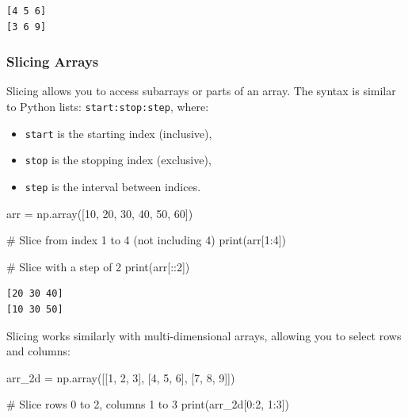 \documentclass[
  letterpaper,
  DIV=11,
  numbers=noendperiod]{scrreprt}
\newenvironment{Shaded}{\begin{snugshade}}{\end{snugshade}}
\newcommand{\BuiltInTok}[1]{\textcolor[rgb]{0.00,0.23,0.31}{#1}}
\newcommand{\CommentTok}[1]{\textcolor[rgb]{0.37,0.37,0.37}{#1}}
\newcommand{\DecValTok}[1]{\textcolor[rgb]{0.68,0.00,0.00}{#1}}
\newcommand{\NormalTok}[1]{\textcolor[rgb]{0.00,0.23,0.31}{#1}}
\newcommand{\OperatorTok}[1]{\textcolor[rgb]{0.37,0.37,0.37}{#1}}
\providecommand{\tightlist}{%
  \setlength{\itemsep}{0pt}\setlength{\parskip}{0pt}}\usepackage{longtable,booktabs,array}
\begin{document}
\begin{verbatim}
[4 5 6]
[3 6 9]
\end{verbatim}

\hypertarget{slicing-arrays}{%
\subsubsection{Slicing Arrays}\label{slicing-arrays}}

Slicing allows you to access subarrays or parts of an array. The syntax
is similar to Python lists: \texttt{start:stop:step}, where:

\begin{itemize}
\tightlist
\item
  \texttt{start} is the starting index (inclusive),
\item
  \texttt{stop} is the stopping index (exclusive),
\item
  \texttt{step} is the interval between indices.
\end{itemize}

\begin{Shaded}
\begin{Highlighting}[]
\NormalTok{arr }\OperatorTok{=}\NormalTok{ np.array([}\DecValTok{10}\NormalTok{, }\DecValTok{20}\NormalTok{, }\DecValTok{30}\NormalTok{, }\DecValTok{40}\NormalTok{, }\DecValTok{50}\NormalTok{, }\DecValTok{60}\NormalTok{])}

\CommentTok{\# Slice from index 1 to 4 (not including 4)}
\BuiltInTok{print}\NormalTok{(arr[}\DecValTok{1}\NormalTok{:}\DecValTok{4}\NormalTok{])  }

\CommentTok{\# Slice with a step of 2}
\BuiltInTok{print}\NormalTok{(arr[::}\DecValTok{2}\NormalTok{])  }
\end{Highlighting}
\end{Shaded}

\begin{verbatim}
[20 30 40]
[10 30 50]
\end{verbatim}

Slicing works similarly with multi-dimensional arrays, allowing you to
select rows and columns:

\begin{Shaded}
\begin{Highlighting}[]
\NormalTok{arr\_2d }\OperatorTok{=}\NormalTok{ np.array([[}\DecValTok{1}\NormalTok{, }\DecValTok{2}\NormalTok{, }\DecValTok{3}\NormalTok{], [}\DecValTok{4}\NormalTok{, }\DecValTok{5}\NormalTok{, }\DecValTok{6}\NormalTok{], [}\DecValTok{7}\NormalTok{, }\DecValTok{8}\NormalTok{, }\DecValTok{9}\NormalTok{]])}

\CommentTok{\# Slice rows 0 to 2, columns 1 to 3}
\BuiltInTok{print}\NormalTok{(arr\_2d[}\DecValTok{0}\NormalTok{:}\DecValTok{2}\NormalTok{, }\DecValTok{1}\NormalTok{:}\DecValTok{3}\NormalTok{])  }
\end{Highlighting}
\end{Shaded}
\end{document}
